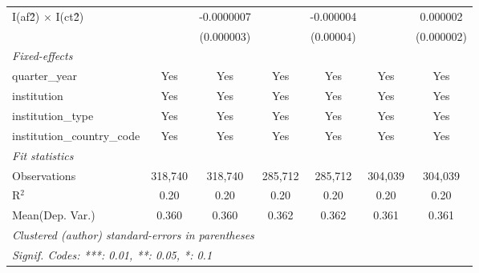 \begin{tabular}{lcccccc}
   I(af\^2) $\times$ I(ct\^2)         &               & -0.0000007      &               & -0.000004       &               & 0.000002\\   
                                      &               & (0.000003)      &               & (0.00004)       &               & (0.000002)\\   
   \midrule
   \emph{Fixed-effects}\\
   quarter\_year                      & Yes           & Yes             & Yes           & Yes             & Yes           & Yes\\  
   institution                        & Yes           & Yes             & Yes           & Yes             & Yes           & Yes\\  
   institution\_type                  & Yes           & Yes             & Yes           & Yes             & Yes           & Yes\\  
   institution\_country\_code         & Yes           & Yes             & Yes           & Yes             & Yes           & Yes\\  
   \midrule
   \emph{Fit statistics}\\
   Observations                       & 318,740       & 318,740         & 285,712       & 285,712         & 304,039       & 304,039\\  
   R$^2$                              & 0.20          & 0.20            & 0.20          & 0.20            & 0.20          & 0.20\\  
Mean(Dep. Var.) & 0.360 & 0.360 & 0.362 & 0.362 & 0.361 & 0.361 \\
   \midrule \midrule
   \multicolumn{7}{l}{\emph{Clustered (author) standard-errors in parentheses}}\\
   \multicolumn{7}{l}{\emph{Signif. Codes: ***: 0.01, **: 0.05, *: 0.1}}\\
\end{tabular}
\par\endgroup
